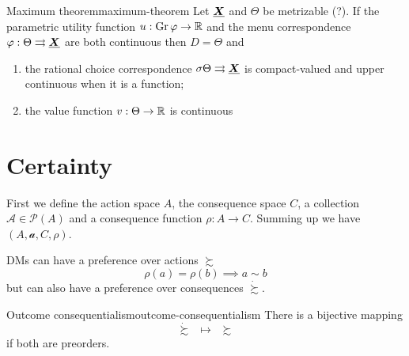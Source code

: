 \documentclass[12pt]{extarticle}
\renewcommand{\vec}[1]{\uvec{#1}}
\newcommand{\Gr}{{\operatorfont Gr} \,}
\begin{document}
\begin{theorem}{Maximum theorem}{maximum-theorem}
    Let $\vec X$ and $\Theta$ be metrizable (?).
    If the parametric utility function $u: \Gr \varphi \to \R$ and the menu correspondence $\varphi: \Theta \rightrightarrows \vec X$ are both continuous then $D = \Theta$ and
    \begin{enumerate}[label=\roman*.]
        \item the rational choice correspondence $\sigma \Theta \rightrightarrows \vec X$ is compact-valued and upper continuous when it is a function;
        \item the value function $v: \Theta \to \mathbb{R}$ is continuous
    \end{enumerate}
\end{theorem}

\section{Certainty}

First we define the action space $A$, the consequence space $C$, a collection $\mathcal A \in \mathcal P(A)$ and a consequence function $\rho: A \to C$.
Summing up we have $(A, \mathcal a, C, \rho)$.

DMs can have a preference over actions $\succsim$
\begin{equation}
    \rho(a) = \rho(b) \implies a \sim b
\end{equation}
but can also have a preference over consequences $\dot \succsim$.

\begin{theorem}{Outcome consequentialism}{outcome-consequentialism}
    There is a bijective mapping
    \begin{equation}
        \dot \succsim \enspace \mapsto \enspace \succsim
    \end{equation}
    if both are preorders.
\end{theorem}
\end{document}
